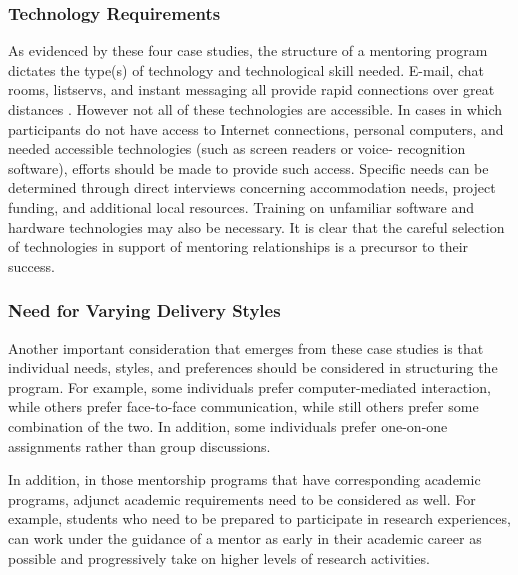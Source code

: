 \documentclass[11.5pt]{sig-alternate} %
\begin{document}
\begin{large}
\subsubsection*{Technology Requirements}
As evidenced by these four case studies, the structure of a mentoring program dictates the type(s) of technology and technological skill needed. E-mail, chat rooms, listservs, and instant messaging all provide rapid connections over great distances . However not all of these technologies are accessible. In cases in which participants do not have access to Internet connections, personal computers, and needed accessible technologies (such as screen readers or voice- recognition software), efforts should be made to provide such access. Specific needs can be determined through direct interviews concerning accommodation needs, project funding, and additional local resources. Training on unfamiliar software and hardware technologies may also be necessary. It is clear that the careful selection of technologies in support of mentoring relationships is a precursor to their success.

\subsubsection*{Need for Varying Delivery Styles}
Another important consideration that emerges from these case studies is that individual needs, styles, and preferences should be considered in structuring the program. For example, some individuals prefer computer-mediated interaction, while others prefer face-to-face communication, while still others prefer some combination of the two. In addition, some individuals prefer one-on-one assignments rather than group discussions.

In addition, in those mentorship programs that have corresponding academic programs, adjunct academic requirements need to be considered as well. For example, students who need to be prepared to participate in research experiences, can work under the guidance of a mentor as early in their academic career as possible and progressively take on higher levels of research activities.


\end{large}
\end{document}
